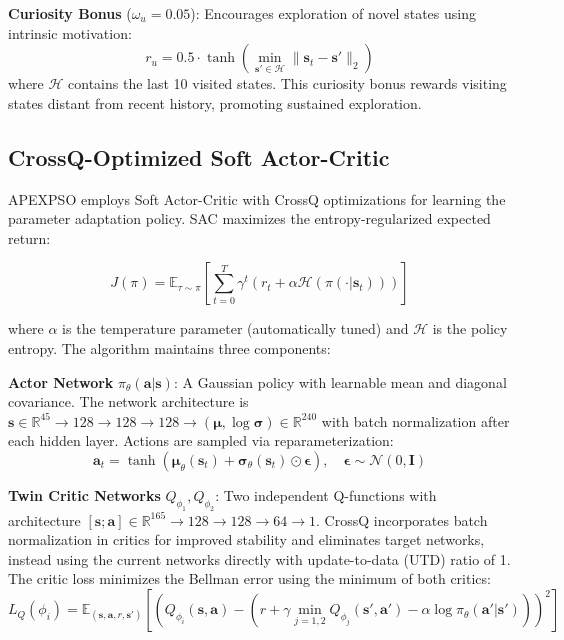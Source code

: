 \documentclass[fleqn,10pt]{wlscirep}
\begin{document}
\textbf{Curiosity Bonus} ($\omega_u = 0.05$): Encourages exploration of novel states using intrinsic motivation:
\begin{equation}
r_u = 0.5 \cdot \tanh\left(\min_{\mathbf{s}' \in \mathcal{H}} \|\mathbf{s}_t - \mathbf{s}'\|_2\right)
\end{equation}
where $\mathcal{H}$ contains the last 10 visited states.
This curiosity bonus rewards visiting states distant from recent history, promoting sustained exploration.

\subsection*{CrossQ-Optimized Soft Actor-Critic}

APEXPSO employs Soft Actor-Critic \cite{haarnoja2018sac} with CrossQ optimizations \cite{crossq2023} for learning the parameter adaptation policy.
SAC maximizes the entropy-regularized expected return:

\begin{equation}
J(\pi) = \mathbb{E}_{\tau \sim \pi}\left[\sum_{t=0}^{T} \gamma^t \left(r_t + \alpha \mathcal{H}(\pi(\cdot|\mathbf{s}_t))\right)\right]
\label{eq:sac_objective}
\end{equation}

where $\alpha$ is the temperature parameter (automatically tuned) and $\mathcal{H}$ is the policy entropy.
The algorithm maintains three components:

\textbf{Actor Network} $\pi_\theta(\mathbf{a}|\mathbf{s})$: A Gaussian policy with learnable mean and diagonal covariance. The network architecture is $\mathbf{s} \in \mathbb{R}^{45} \to 128 \to 128 \to 128 \to (\boldsymbol{\mu}, \log \boldsymbol{\sigma}) \in \mathbb{R}^{240}$ with batch normalization after each hidden layer. Actions are sampled via reparameterization:
\begin{equation}
\mathbf{a}_t = \tanh(\boldsymbol{\mu}_\theta(\mathbf{s}_t) + \boldsymbol{\sigma}_\theta(\mathbf{s}_t) \odot \boldsymbol{\epsilon}), \quad \boldsymbol{\epsilon} \sim \mathcal{N}(0, \mathbf{I})
\end{equation}

\textbf{Twin Critic Networks} $Q_{\phi_1}, Q_{\phi_2}$: Two independent Q-functions with architecture $[\mathbf{s}; \mathbf{a}] \in \mathbb{R}^{165} \to 128 \to 128 \to 64 \to 1$. CrossQ incorporates batch normalization in critics for improved stability and eliminates target networks, instead using the current networks directly with update-to-data (UTD) ratio of 1. The critic loss minimizes the Bellman error using the minimum of both critics:
\begin{equation}
L_Q(\phi_i) = \mathbb{E}_{(\mathbf{s},\mathbf{a},r,\mathbf{s}')} \left[\left(Q_{\phi_i}(\mathbf{s}, \mathbf{a}) - \left(r + \gamma \min_{j=1,2} Q_{\phi_j}(\mathbf{s}', \mathbf{a}') - \alpha \log \pi_\theta(\mathbf{a}'|\mathbf{s}')\right)\right)^2\right]
\end{equation}
\end{document}
